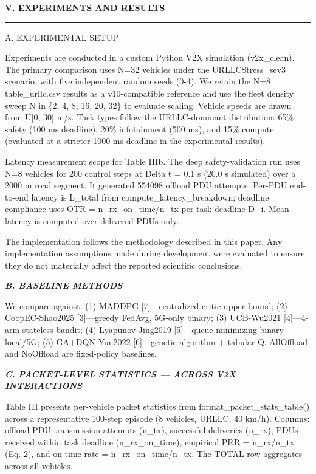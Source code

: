 \documentclass[journal,10pt,twocolumn]{IEEEtran}
\begin{document}
\textbf{V. EXPERIMENTS AND RESULTS}

\begin{center}\rule{0.5\linewidth}{0.5pt}\end{center}

A. EXPERIMENTAL SETUP

Experiments are conducted in a custom Python V2X simulation
(v2x\_clean). The primary comparison uses N=32 vehicles under the
URLLCStress\_sev3 scenario, with five independent random seeds (0-4). We
retain the N=8 table\_urllc.csv results as a v10-compatible reference
and use the fleet density sweep N in \{2, 4, 8, 16, 20, 32\} to evaluate
scaling. Vehicle speeds are drawn from U{[}0, 30{]} m/s. Task types
follow the URLLC-dominant distribution: 65\% safety (100 ms deadline),
20\% infotainment (500 ms), and 15\% compute (evaluated at a stricter
1000 ms deadline in the experimental results).

Latency measurement scope for Table IIIb. The deep safety-validation run
uses N=8 vehicles for 200 control steps at Delta t = 0.1 s (20.0 s
simulated) over a 2000 m road segment. It generated 554098 offload PDU
attempts. Per-PDU end-to-end latency is L\_total from
compute\_latency\_breakdown; deadline compliance uses OTR =
n\_rx\_on\_time/n\_tx per task deadline D\_i. Mean latency is computed
over delivered PDUs only.

The implementation follows the methodology described in this paper. Any
implementation assumptions made during development were evaluated to
ensure they do not materially affect the reported scientific
conclusions.

\emph{\textbf{B. BASELINE METHODS}}

We compare against: (1) MADDPG {[}7{]}---centralized critic upper bound;
(2) CoopEC-Shao2025 {[}3{]}---greedy FedAvg, 5G-only binary; (3)
UCB-Wu2021 {[}4{]}---4-arm stateless bandit; (4) Lyapunov-Jing2019
{[}5{]}---queue-minimizing binary local/5G; (5) GA+DQN-Yun2022
{[}6{]}---genetic algorithm + tabular Q. AllOffload and NoOffload are
fixed-policy baselines.

\emph{\textbf{C. PACKET-LEVEL STATISTICS --- ACROSS V2X INTERACTIONS}}

Table III presents per-vehicle packet statistics from
format\_packet\_stats\_table() across a representative 100-step episode
(8 vehicles, URLLC, 40 km/h). Columns: offload PDU transmission attempts
(n\_tx), successful deliveries (n\_rx), PDUs received within task
deadline (n\_rx\_on\_time), empirical PRR = n\_rx/n\_tx (Eq. 2), and
on-time rate = n\_rx\_on\_time/n\_tx. The TOTAL row aggregates across
all vehicles.
\end{document}
